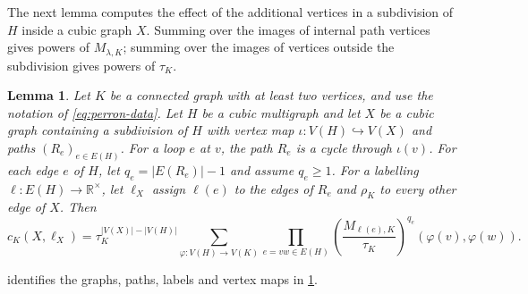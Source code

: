 \documentclass[11pt,a4paper]{article}
\theoremstyle{plain}
\newtheorem{lemma}[theorem]{Lemma}
\theoremstyle{definition}
\newcommand{\R}{\mathbb{R}}
\begin{document}
The next lemma computes the effect of the additional vertices in a
subdivision of $H$ inside a cubic graph $X$.
Summing over the images of internal path vertices gives powers of $M_{\lambda,K}$;
summing over the images of vertices outside the subdivision gives powers of $\tau_K$.
\begin{lemma}\label{lem:perron-transfer}
 Let $K$ be a connected graph with at least two vertices, and use the notation of
 \cref{eq:perron-data}. Let $H$ be a cubic multigraph and let $X$ be a
 cubic graph containing a subdivision of $H$ with vertex map
 $\iota:V(H)\hookrightarrow V(X)$ and paths $(R_e)_{e\in E(H)}$.
 For a loop $e$ at $v$, the path $R_e$ is a cycle through $\iota(v)$.
 For each edge $e$ of $H$, let $q_e=|E(R_e)|-1$ and assume $q_e\geq1$.
 For a labelling $\ell:E(H)\to\R^\times$, let $\ell_X$ assign
 $\ell(e)$ to the edges of $R_e$ and $\rho_K$ to every other edge of $X$.
 Then
 \begin{equation}\label{eq:perron-transfer}
  c_K(X,\ell_X)=\tau_K^{|V(X)|-|V(H)|}
    \sum_{\varphi:V(H)\to V(K)}
    \prod_{e=vw\in E(H)}
      \left(\frac{M_{\ell(e),K}}{\tau_K}\right)^{q_e}(\varphi(v),\varphi(w)).
 \end{equation}
\end{lemma}
\noindent{} identifies the graphs, paths, labels and vertex maps
in \cref{lem:perron-transfer}.
\end{document}
